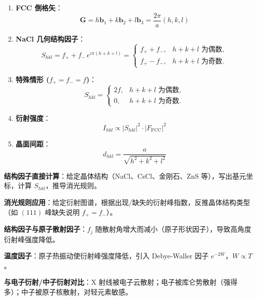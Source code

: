 \begin{formulabox}[核心公式]
\begin{enumerate}[label=\textbf{(\arabic*)}]
    \item \textbf{FCC 倒格矢}：
    \[
    \mathbf{G}=h\mathbf{b}_1+k\mathbf{b}_2+l\mathbf{b}_3=\frac{2\pi}{a}(h,k,l)
    \]

    \item \textbf{NaCl 几何结构因子}：
    \[
    S_{hkl}=f_++f_-\,e^{i\pi(h+k+l)}
    =\begin{cases}
    f_++f_-, & h+k+l\text{ 为偶数},\\
    f_+-f_-, & h+k+l\text{ 为奇数}.
    \end{cases}
    \]

    \item \textbf{特殊情形 ($f_+=f_-=f$)}：
    \[
    S_{hkl}=\begin{cases}
    2f, & h+k+l\text{ 为偶数},\\
    0, & h+k+l\text{ 为奇数}.
    \end{cases}
    \]

    \item \textbf{衍射强度}：
    \[
    I_{hkl}\propto|S_{hkl}|^2\cdot|F_{\text{FCC}}|^2
    \]

    \item \textbf{晶面间距}：
    \[
    d_{hkl}=\frac{a}{\sqrt{h^2+k^2+l^2}}
    \]
\end{enumerate}
\end{formulabox}

\begin{drillbox}[训练点与考法变体]
 \textbf{结构因子直接计算}：给定晶体结构（NaCl、CsCl、金刚石、ZnS 等），写出基元坐标，计算 $S_{hkl}$，推导消光规则。

 \textbf{消光规则应用}：给定衍射图谱，根据出现/缺失的衍射峰指数，反推晶体结构类型（如 $(111)$ 峰缺失说明 $f_+=f_-$）。

 \textbf{结构因子与原子散射因子}：$f_j$ 随散射角增大而减小（原子形状因子），导致高角度衍射峰强度降低。

 \textbf{温度因子}：原子热振动使衍射峰强度降低，引入 Debye-Waller 因子 $e^{-2W}$，$W\propto T$。

 \textbf{与电子衍射/中子衍射对比}：X 射线被电子云散射；电子被库仑势散射（强得多）；中子被原子核散射，对轻元素敏感。
\end{drillbox}

